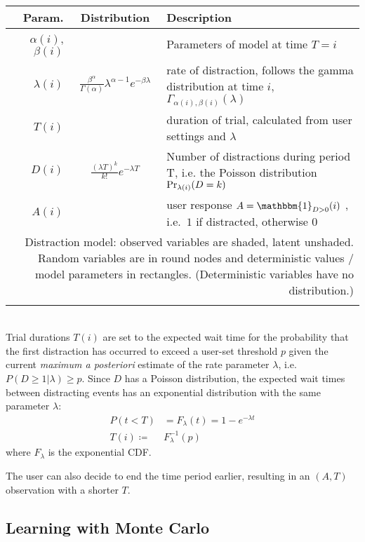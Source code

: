 \documentclass{article}
\begin{document}
\begin{tabularx}{\linewidth-20pt}{r c X}
	\toprule
		Param. & Distribution &Description\\
	\midrule
		$\alpha(i)$, $\beta(i)$ &  & Parameters of model at time $T=i$\\
		$\lambda(i)$& $\frac{\beta^\alpha}{\Gamma(\alpha)}\lambda^{\alpha-1}e^{-\beta\lambda}$&rate of distraction, follows the gamma distribution  at time $i$, $\Gamma_{\alpha(i),\beta(i)}(\lambda)$\\
		$T(i)$ &  & duration of trial, calculated from user settings and $\lambda$ \\
		$D(i)$& $\frac{(\lambda T)^k}{k!} e^{-\lambda T}$ & Number of distractions during period T, i.e. the Poisson distribution ${\rm Pr}_{\lambda(i)}(D=k)$\\
		$A(i)$ &  & user response $A=\mathbbm{1}_{D>0}(i)$ , i.e.\ $1$ if distracted, otherwise $0$\\
	\bottomrule


	\multicolumn{3}{p{\linewidth-30pt}}{	\rule{0pt}{4ex}  Distraction model:  observed variables are shaded, latent unshaded.  Random variables are in round nodes and deterministic values / model parameters in rectangles.  (Deterministic variables have no distribution.)}
	\\\\
\end{tabularx}
\\
Trial durations $T(i)$ are set to the expected wait time for the probability that the first distraction has occurred to exceed a user-set threshold $p$ given the current \emph{maximum a posteriori}  estimate of the rate parameter $\lambda$,  i.e. $P(D\geq 1|\lambda) \geq p$.  Since $D$ has a Poisson distribution, the expected wait times between distracting events has an exponential distribution with the same parameter $\lambda$:
\begin{align}
  P(t<T)&=F_{\lambda}(t)=1-e^{-\lambda  t}\nonumber\\
  T(i)\coloneqq& F_{\lambda}^{-1}(p)
\end{align}
where $F_{\lambda}$ is the exponential CDF.  

The user can also decide to end the time period earlier, resulting in an $(A, T)$ observation with a shorter $T$.
\subsection{Learning with Monte Carlo}
\end{document}
